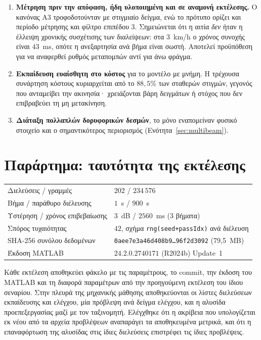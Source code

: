 \documentclass[11pt,a4paper]{article}
\begin{document}
\begin{enumerate}
\item \textbf{Μέτρηση πριν την απόφαση, ήδη υλοποιημένη και σε αναμονή
εκτέλεσης.} Ο κανόνας A3 τροφοδοτούνταν με στιγμιαίο δείγμα, ενώ το πρότυπο
ορίζει και περίοδο μέτρησης και φίλτρο επιπέδου 3. Σημειώνεται ότι η αιτία
\emph{δεν} ήταν η έλλειψη χρονικής συσχέτισης των διαλείψεων: στα $3$~km/h ο
χρόνος συνοχής είναι $43$~ms, οπότε η ανεξαρτησία ανά βήμα είναι σωστή.
Αποτελεί προϋπόθεση για να αναφερθεί ρυθμός μεταπομπών αντί για άνω φράγμα.
\item \textbf{Εκπαίδευση ευαίσθητη στο κόστος} για το μοντέλο με μνήμη. Η
τρέχουσα συνάρτηση κόστους κυριαρχείται από το $88{,}5\%$ των σταθερών
στιγμών, γεγονός που ανταμείβει την ακινησία· χρειάζονται βάρη δειγμάτων ή
στόχος που δεν επιβραβεύει τη μη μετακίνηση.
\item \textbf{Διάταξη πολλαπλών δορυφορικών δεσμών}, το μόνο εναπομείναν
φυσικό στοιχείο και ο σημαντικότερος περιορισμός
(Ενότητα~\ref{sec:multibeam}).
\end{enumerate}

\section*{Παράρτημα: ταυτότητα της εκτέλεσης}

\begin{center}\small
\begin{tabular}{@{}ll@{}}
\toprule
Διελεύσεις / γραμμές & $202$ / $234\,576$ \\
Βήμα / παράθυρο διέλευσης & $1$~s / $900$~s \\
Υστέρηση / χρόνος επιβεβαίωσης & $3$~dB / $2560$~ms (3 βήματα) \\
Σπόρος τυχαιότητας & $42$, σχήμα \texttt{rng(seed+passIdx)} ανά διέλευση \\
SHA-256 συνόλου δεδομένων & \texttt{0aee7e3a46d408b9\dots 96f2d3092} (79,5~MB) \\
Έκδοση MATLAB & $24.2.0.2740171$ (R2024b) Update~1 \\
\bottomrule
\end{tabular}
\end{center}

\vspace{6pt}
\noindent
Κάθε εκτέλεση αποθηκεύει φάκελο με τις παραμέτρους, το \textenglish{commit}, την
έκδοση του MATLAB και τη διαφορά παραμέτρων από την προηγούμενη εκτέλεση του
ίδιου σεναρίου. Στην πλευρά της μηχανικής μάθησης αποθηκεύονται οι λίστες
διελεύσεων εκπαίδευσης και ελέγχου, μία πρόβλεψη ανά δείγμα ελέγχου, και η
αλυσίδα προεπεξεργασίας μαζί με τον ταξινομητή. Ελέγχθηκε ότι η ακρίβεια που
υπολογίζεται εκ νέου από τα αρχεία προβλέψεων αναπαράγει τα αποθηκευμένα
μετρικά, και ότι η επαναφόρτωση της αλυσίδας στις ίδιες διελεύσεις επιστρέφει
τις ίδιες προβλέψεις.
\end{document}
